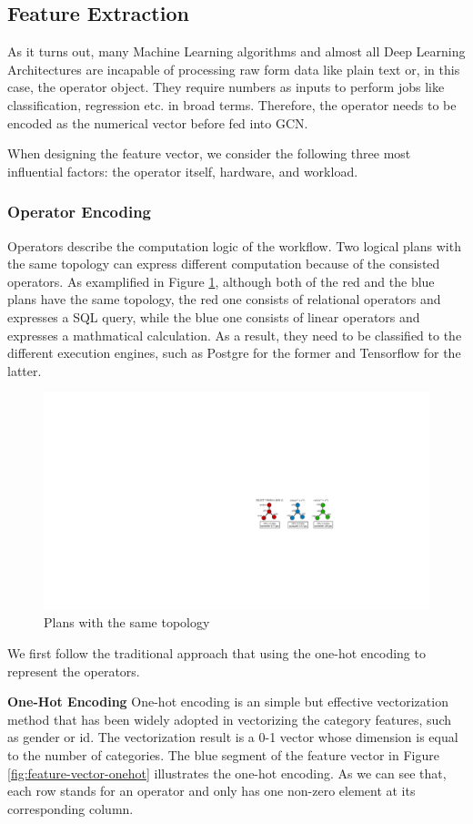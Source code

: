 \subsection{Feature Extraction}
As it turns out, many Machine Learning algorithms and almost all Deep Learning Architectures are incapable of processing raw form data like plain text or, in this case, the operator object. 
They require numbers as inputs to perform jobs like classification, regression etc. in broad terms. 
Therefore, the operator needs to be encoded as the numerical vector before fed into GCN.

When designing the feature vector, we consider the following three most influential factors: the operator itself, hardware, and workload.

\subsubsection{Operator Encoding}
Operators describe the computation logic of the workflow.
Two logical plans with the same topology can express different computation because of the consisted operators.
As examplified in Figure \ref{fig:graph-comparison}, although both of the red and the blue plans have the same topology,
the red one consists of relational operators and expresses a SQL query, while the blue one consists of linear operators and expresses a mathmatical calculation.
As a result, they need to be classified to the different execution engines, such as Postgre for the former and Tensorflow for the latter.

\begin{figure}
  \centering
  \includegraphics[width=0.7\linewidth]{figures/graph-comparison.pdf}
  \caption{Plans with the same topology}
  \label{fig:graph-comparison}
\end{figure}

We first follow the traditional approach that using the one-hot encoding to represent the operators.

\textbf{One-Hot Encoding}
One-hot encoding is an simple but effective vectorization method that has been widely adopted in vectorizing the category features, such as gender or id. 
The vectorization result is a 0-1 vector whose dimension is equal to the number of categories.
The blue segment of the feature vector in Figure \ref{fig:feature-vector-onehot} illustrates the one-hot encoding. 
As we can see that, each row stands for an operator and only has one non-zero element at its corresponding column.

